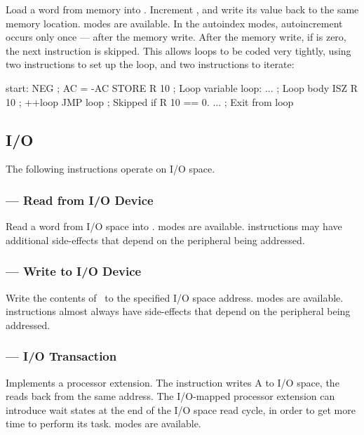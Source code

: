 Load a word from memory into \A. Increment \A{}, and write its value back to
the same memory location. \AMGroupOne modes are available. In the autoindex
modes, autoincrement occurs only once — after the memory write. After the
memory write, if \AC{} is zero, the next instruction is skipped. This allows
loops to be coded very tightly, using two instructions to set up the loop, and
two instructions to iterate:

\begin{cftasmcode}
start:  NEG          ; AC = -AC
        STORE R 10   ; Loop variable
loop:   
        ...          ; Loop body
        ISZ R 10     ; ++loop
        JMP loop     ; Skipped if R 10 == 0.
        ...          ; Exit from loop
\end{cftasmcode}

\subsection{I/O}

The following instructions operate on I/O space.

\subsubsection{ — Read from I/O Device}
\label{sec:instruction-IN}

Read a word from I/O space into \A. \AMGroupOne modes are available. 
instructions may have additional side-effects that depend on the peripheral
being addressed.

\subsubsection{ — Write to I/O Device}
\label{sec:instruction-OUT}

Write the contents of \A\ to the specified I/O space address. \AMGroupOne modes
are available.  instructions almost always have side-effects that
depend on the peripheral being addressed.

\subsubsection{ — I/O Transaction}
\label{sec:instruction-IOT}

Implements a processor extension. The  instruction writes A to I/O
space, the reads \A{} back from the same address. The I/O-mapped processor
extension can introduce wait states at the end of the I/O space read cycle, in
order to get more time to perform its task. \AMGroupOne modes are available.

